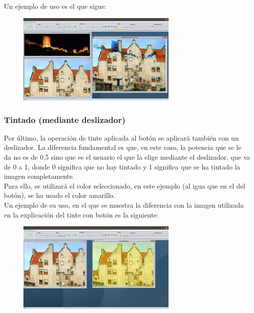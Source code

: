 \documentclass[11pt,a4paper]{article}
\begin{document}
Un ejemplo de uso es el que sigue:

\begin{figure}[H]
\centering
	\includegraphics[width=0.7\textwidth]{img/resta.png}
\end{figure}

\subsubsection{Tintado (mediante deslizador)}
Por último, la operación de tinte aplicada al botón se aplicará también con un deslizador. La diferencia fundamental es que, en este caso, la potencia que se le da no es de 0,5 sino que es el usuario el que la elige mediante el deslizador, que va de 0 a 1, donde 0 significa que no hay tintado y 1 significa que se ha tintado la imagen completamente.\\

Para ello, se utilizará el color seleccionado, en este ejemplo (al igua que en el del botón), se ha usado el color amarillo.\\

Un ejemplo de su uso, en el que se muestra la diferencia con la imagen utilizada en la explicación del tinte con botón es la siguiente:

\begin{figure}[H]
\centering
	\includegraphics[width=0.7\textwidth]{img/tintedes.png}
\end{figure}
\end{document}
